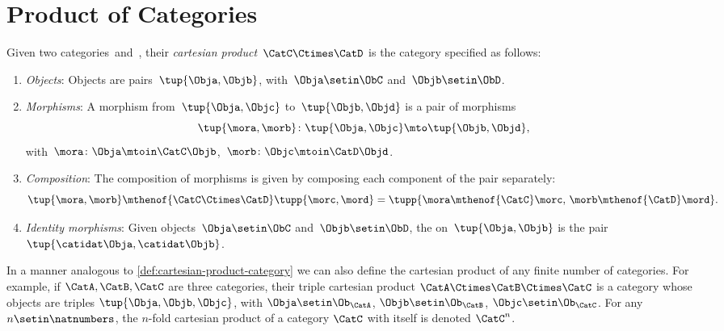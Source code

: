 
\section{Product of Categories}

\begin{ctdefinition}
    \label{def:cartesian-product-category}
    Given two categories~\CatC and~\CatD, their \emph{cartesian product}~$\CatC \Ctimes \CatD$ is the category specified as follows:
    \begin{enumerate}
        \item \emph{Objects}: Objects are pairs~$\tup{\Obja,\Objb}$, with~$\Obja\setin \ObC$ and~$\Objb\setin \ObD$.
        \item \emph{Morphisms}: A morphism from~$\tup{\Obja, \Objc}$ to~$\tup{\Objb,\Objd}$ is a pair of morphisms
              \begin{equation}\label{eq:prod-cat-morphisms}
                  \tup{\mora,\morb} \colon \tup{\Obja,\Objc}\mto \tup{\Objb,\Objd},
              \end{equation}
              with~$\mora\colon \Obja \mtoin\CatC \Objb$,~$\morb\colon \Objc\mtoin\CatD \Objd$.
        \item \emph{Composition}: The composition of morphisms is given by composing each component of the pair separately:
              \begin{equation}
                  \tup{\mora,\morb}\mthenof{\CatC\Ctimes\CatD} \tupp{\morc,\mord}=\tupp{\mora\mthenof{\CatC}\morc,\, \morb \mthenof{\CatD} \mord}.
              \end{equation}
        \item \emph{Identity morphisms}: Given objects~$\Obja\setin \ObC$ and~$\Objb\setin \ObD$, the  on~$\tup{\Obja,\Objb}$ is the pair $\tup{\catidat\Obja,\catidat\Objb}$.
    \end{enumerate}
\end{ctdefinition}

\begin{remark}
In a manner analogous to \cref{def:cartesian-product-category} we can also define the cartesian product of any finite number of categories. For example, if $\CatA, \CatB, \CatC$ are three categories, their triple cartesian product $\CatA \Ctimes \CatB \Ctimes \CatC$ is a category whose objects are triples $\tup{\Obja, \Objb, \Objc}$, with $\Obja\setin \Ob_\CatA$, $\Objb\setin \Ob_\CatB$, $\Objc\setin \Ob_\CatC$. For any $n \setin \natnumbers$, the $n$-fold cartesian product of a category $\CatC$ with itself is denoted $\CatC^n$. 
\end{remark}

